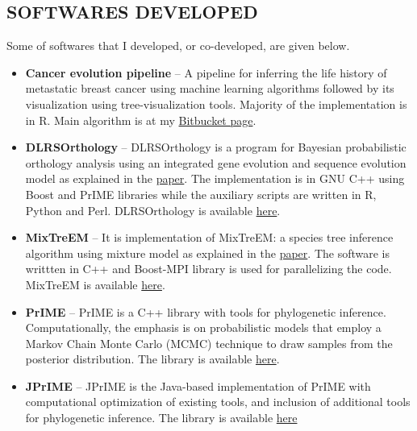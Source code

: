 \documentclass[margin, 10pt]{res} %
\begin{document}
\begin{resume}
\section{SOFTWARES DEVELOPED} 
Some of softwares that I developed, or co-developed, are given below.
\begin{itemize}
\item \textbf{Cancer evolution pipeline} -- A pipeline for inferring the life history of metastatic breast cancer using machine learning algorithms followed by its visualization using tree-visualization tools. Majority of the implementation is in R. Main algorithm is at my \href{https://bitbucket.org/ikramu/dolloparsimonyforcancerevolution}{Bitbucket page}. 
\item \textbf{DLRSOrthology} -- DLRSOrthology is a program for Bayesian probabilistic orthology analysis using an integrated gene evolution and sequence evolution model as explained in the \href{https://doi.org/10.1093/sysbio/syv044}{paper}. The implementation is in GNU C++ using Boost and PrIME libraries while the auxiliary scripts are written in R, Python and Perl. DLRSOrthology is available \href{https://bitbucket.org/ikramu/dlrsorthology}{here}.
\item \textbf{MixTreEM} -- It is implementation of MixTreEM: a species tree inference algorithm using mixture model as explained in the \href{https://doi.org/10.1093/molbev/msv115}{paper}. The software is writtten in C++ and Boost-MPI library is used for parallelizing the code. MixTreEM is available \href{https://bitbucket.org/ikramu/mixtreem}{here}.
\item \textbf{PrIME} -- PrIME is a C++ library with tools for phylogenetic inference. Computationally, the emphasis is on probabilistic models that employ a Markov Chain Monte Carlo (MCMC) technique to draw samples from the posterior distribution. The library is available \href{http://prime.scilifelab.se/}{here}.
\item \textbf{JPrIME} -- JPrIME is the Java-based implementation of PrIME with computational optimization of existing tools, and inclusion of additional tools for phylogenetic inference. The library is available \href{https://github.com/arvestad/jprime}{here}
\end{itemize}



\end{resume}
\end{document}
